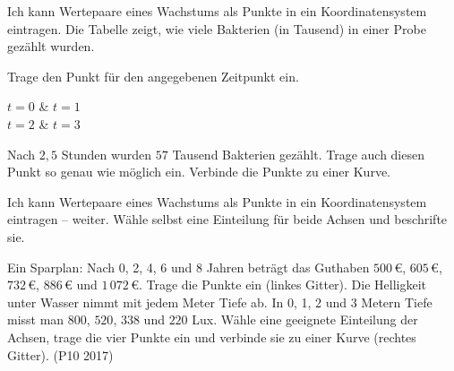 \begin{aufgabe}{Ich kann Wertepaare eines Wachstums als Punkte in ein Koordinatensystem eintragen. Die Tabelle zeigt, wie viele Bakterien (in Tausend) in einer Probe gezählt wurden.}
\begin{minipage}[t]{0.52\linewidth}\vspace{0pt}
\begin{ksys}[xmin=0,xmax=4,ymin=0,ymax=90,xstep=0.5,ystep=10,xlabel=$t$ in h,ylabel=Tausend]
\end{ksys}
\end{minipage}\hfill
\begin{minipage}[t]{0.46\linewidth}\vspace{0pt}
Trage den Punkt für den angegebenen Zeitpunkt ein.
\begin{teilezwei}
\tz $t = 0$ & \tz $t = 1$ \\
\tz $t = 2$ & \tz $t = 3$ \\
\end{teilezwei}
\begin{teile}
\teil Nach $2{,}5$ Stunden wurden $57$ Tausend Bakterien gezählt. Trage auch diesen Punkt so genau wie möglich ein.
\teil Verbinde die Punkte zu einer Kurve.
\end{teile}
\end{minipage}
\end{aufgabe}

\begin{aufgabe}{Ich kann Wertepaare eines Wachstums als Punkte in ein Koordinatensystem eintragen – weiter. Wähle selbst eine Einteilung für beide Achsen und beschrifte sie.}
\begin{teile}
\teil Ein Sparplan: Nach 0, 2, 4, 6 und 8 Jahren beträgt das Guthaben $500\,€$, $605\,€$, $732\,€$, $886\,€$ und $1\,072\,€$. Trage die Punkte ein (linkes Gitter).
\teil Die Helligkeit unter Wasser nimmt mit jedem Meter Tiefe ab. In 0, 1, 2 und 3 Metern Tiefe misst man $800$, $520$, $338$ und $220$ Lux. Wähle eine geeignete Einteilung der Achsen, trage die vier Punkte ein und verbinde sie zu einer Kurve (rechtes Gitter). (P10 2017)
\end{teile}

\hspace{0.8cm}

\end{aufgabe}

